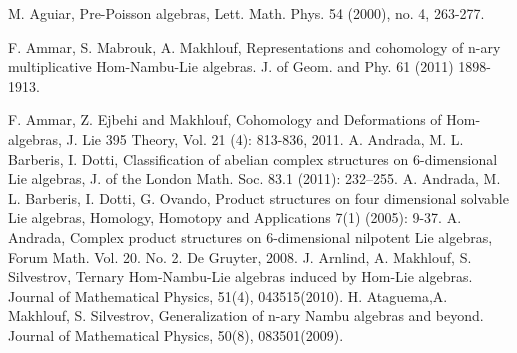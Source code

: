 \documentclass[a4paper,11pt]{article}
\theoremstyle{definition}
\begin{document}
\begin{thebibliography}{999}

 M. Aguiar, Pre-Poisson algebras, Lett. Math. Phys. 54 (2000), no. 4, 263-277.

F. Ammar, S. Mabrouk, A. Makhlouf, Representations and cohomology of n-ary multiplicative
Hom-Nambu-Lie algebras. J. of Geom. and Phy. 61 (2011) 1898-1913.

 F. Ammar, Z. Ejbehi and Makhlouf, Cohomology and Deformations of Hom-algebras, J. Lie
395 Theory, Vol. 21 (4): 813-836, 2011.
A. Andrada, M. L. Barberis, I. Dotti, Classification of abelian complex structures on
6-dimensional Lie algebras, J. of the London Math. Soc. 83.1 (2011): 232--255.
 A. Andrada, M. L. Barberis, I. Dotti, G. Ovando, Product structures on four dimensional
solvable Lie algebras, Homology, Homotopy and Applications 7(1) (2005): 9-37.
A. Andrada, Complex product structures on 6-dimensional nilpotent Lie algebras, Forum Math. Vol. 20. No. 2. De Gruyter, 2008.
 J. Arnlind, A. Makhlouf, S. Silvestrov,  Ternary Hom-Nambu-Lie algebras induced by Hom-Lie algebras. Journal of Mathematical Physics, 51(4), 043515(2010).
 H. Ataguema,A. Makhlouf, S.  Silvestrov,  Generalization of n-ary Nambu algebras and beyond. Journal of Mathematical Physics, 50(8), 083501(2009).


\end{thebibliography}
\end{document}
